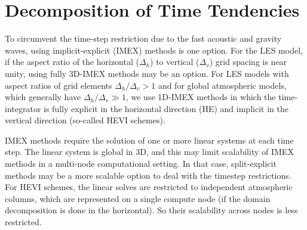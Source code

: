 \documentclass{report}
\numberwithin{equation}{section}
\begin{document}
\section{Decomposition of Time Tendencies}

To circumvent the time-step restriction due to the fast acoustic and gravity waves, using implicit-explicit (IMEX) methods is one option. For the LES model, if the aspect ratio of the horizontal ($\Delta_h$) to vertical ($\Delta_v$) grid spacing is near unity, using fully 3D-IMEX methods may be an option.  For LES models with aspect ratios of grid elements $\Delta_h/\Delta_v > 1$ and for global atmospheric models, which generally have $\Delta_h/\Delta_v \gg 1$, we use 1D-IMEX methods in which the time-integrator is fully explicit in the horizontal direction (HE) and implicit in the vertical direction (so-called HEVI schemes). 

IMEX methods require the solution of one or more linear systems at each time step. The linear system is global in 3D, and this may limit scalability of IMEX methods in a multi-node computational setting. In that case, split-explicit methods may be a more scalable option to deal with the timestep restrictions. For HEVI schemes, the linear solves are restricted to independent atmospheric columns, which are represented on a single compute node (if the domain decomposition is done in the horizontal). So their scalability across nodes is less restricted.
\end{document}
